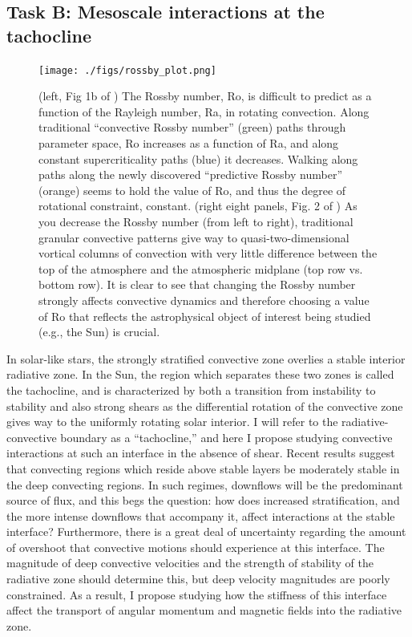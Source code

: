 \documentclass[aasms,11pt]{article}
\begin{document}
\subsection{Task B: Mesoscale interactions at the tachocline}
\begin{figure}[t!]
    \texttt{[image: ./figs/rossby\_plot.png]}
    \caption{(left, Fig 1b of \citet{anders&all2019}) The Rossby number, Ro, is difficult to predict as a function of the Rayleigh number, Ra, in rotating convection.
	Along traditional ``convective Rossby number'' (green) paths through parameter space, Ro increases as a function of Ra, and along constant supercriticality paths (blue) it decreases.
	Walking along paths along the newly discovered ``predictive Rossby number'' (orange) seems to hold the value of Ro, and thus the degree of rotational constraint, constant.
	(right eight panels, Fig. 2 of \citet{anders&all2019}) As you decrease the Rossby number (from left to right), traditional granular convective patterns give way to quasi-two-dimensional vortical columns of convection with very little difference between the top of the atmosphere and the atmospheric midplane (top row vs. bottom row).
	It is clear to see that changing the Rossby number strongly affects convective dynamics and therefore choosing a value of Ro that reflects the astrophysical object of interest being studied (e.g., the Sun) is crucial.
	\label{fig:rossby_plot} }
\end{figure}

In solar-like stars, the strongly stratified convective zone overlies a stable interior radiative zone.
In the Sun, the region which separates these two zones is called the tachocline, and is characterized by both a transition from instability to stability and also strong shears as the differential rotation of the convective zone gives way to the uniformly rotating solar interior.
I will refer to the radiative-convective boundary as a ``tachocline,'' and here I propose studying convective interactions at such an interface in the absence of shear. 
Recent results suggest that convecting regions which reside above stable layers be moderately stable in the deep convecting regions.
In such regimes, downflows will be the predominant source of flux, and this begs the question: how does increased stratification, and the more intense downflows that accompany it, affect interactions at the stable interface?
Furthermore, there is a great deal of uncertainty regarding the amount of overshoot that convective motions should experience at this interface.
The magnitude of deep convective velocities and the strength of stability of the radiative zone should determine this, but deep velocity magnitudes are poorly constrained.
As a result, I propose studying how the stiffness \citep[or, whether or not convective motions can penetrate the stable region, as in][]{couston&all2017} of this interface affect the transport of angular momentum and magnetic fields into the radiative zone.
\end{document}
